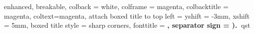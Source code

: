 \usepackage{wallpaper}

\usepackage{draftwatermark}

\usepackage[displaymath,left]{lineno}

\usepackage{rotating}

\usepackage{graphicx}

\usepackage{multirow}

\usepackage{amsmath}

\usepackage{tcolorbox}
%
{enhanced, breakable,
  colback = white, colframe = magenta, colbacktitle = magenta, coltext=magenta,
  attach boxed title to top left = {yshift = -3mm, xshift = 5mm},
  boxed title style = {sharp corners},
  fonttitle = \sffamily\bfseries, separator sign = {).~}}{qst}



